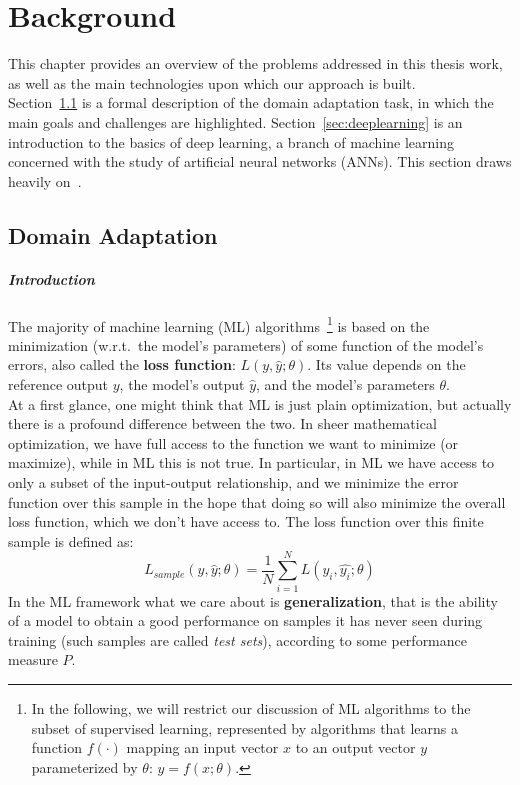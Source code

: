 \documentclass[../main.tex]{subfiles}
\begin{document}
    \chapter{Background}\label{chap:background}

    This chapter provides an overview of the problems addressed in this thesis work, as well as the main
    technologies upon which our approach is built. \\
    Section~\ref{sec:domainadapt} is a formal description of the domain adaptation task, in which
    the main goals and challenges are highlighted.
    Section~\ref{sec:deeplearning} is an introduction to the basics of deep learning,
    a branch of machine learning concerned with the study of artificial neural networks (ANNs).
    This section draws heavily on~\cite{Goodfellow-et-al-2016}.

    \section{Domain Adaptation}\label{sec:domainadapt}

    \paragraph{Introduction}
    The majority of machine learning (ML) algorithms~\footnote{In the following, we will restrict our discussion of
    ML algorithms to the subset of supervised learning, represented by algorithms that learns a function $f(\cdot)$
    mapping an input vector $x$ to an output vector $y$ parameterized by $\theta$: $y = f(x; \theta)$.}
    is based on the minimization (w.r.t.\ the model's parameters)
    of some function of the model's errors,
    also called the \textbf{loss function}: $L(y, \hat{y}; \theta)$. Its value depends on the reference output $y$, the model's output
    $\hat{y}$, and the model's parameters $\theta$. \\
    At a first glance, one might think that ML is just plain optimization, but actually there is a profound difference
    between the two. In sheer mathematical optimization, we have full access to the function we want to minimize (or maximize),
    while in ML this is not true. In particular, in ML we have access to only a subset of the input-output relationship,
    and we minimize the error function over this sample in the hope that doing so will also minimize the overall loss function,
    which we don't have access to. The loss function over this finite sample is defined as:
    $$ L_{sample}(y, \hat{y}; \theta) = \frac{1}{N} \sum_{i = 1}^{N} L(y_{i}, \hat{y_{i}}; \theta) $$
    In the ML framework what we care about is \textbf{generalization}, that is the ability of a model to obtain a good
    performance on samples it has never seen during training (such samples are called \textit{test sets}), according to some performance measure $P$.
\end{document}
